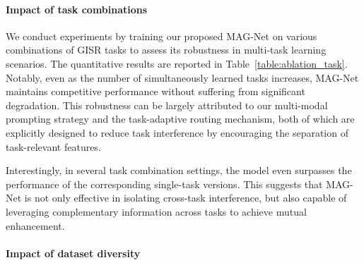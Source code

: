 \documentclass[lettersize,journal]{IEEEtran}
\begin{document}
\paragraph{Impact of task combinations}
We conduct experiments by training our proposed MAG-Net on various combinations of GISR tasks to assess its robustness in multi-task learning scenarios. The quantitative results are reported in Table~\ref{table:ablation_task}. Notably, even as the number of simultaneously learned tasks increases, MAG-Net maintains competitive performance without suffering from significant degradation. 
This robustness can be largely attributed to our multi-modal prompting strategy and the task-adaptive routing mechanism, both of which are explicitly designed to reduce task interference by encouraging the separation of task-relevant features. 


Interestingly, in several task combination settings, the model even surpasses the performance of the corresponding single-task versions. This suggests that MAG-Net is not only effective in isolating cross-task interference, but also capable of leveraging complementary information across tasks to achieve mutual enhancement. 


\paragraph{Impact of dataset diversity}
\end{document}
